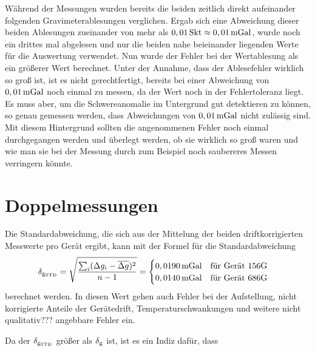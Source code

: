 Während der Messungen wurden bereits die beiden zeitlich direkt aufeinander folgenden Gravimeterablesungen verglichen. Ergab sich eine Abweichung dieser beiden Ablesungen zueinander von mehr als $0,01\,\mathrm{Skt}\approx0,01\,\mathrm{mGal}$, wurde noch ein drittes mal abgelesen und nur die beiden nahe beieinander liegenden Werte für die Auswertung verwendet. Nun wurde der Fehler bei der Wertablesung als ein größerer Wert berechnet. Unter der Annahme, dass der Ablesefehler wirklich so groß ist, ist es nicht gerechtfertigt, bereits bei einer Abweichung von $0,01\,\mathrm{mGal}$ noch einmal zu messen, da der Wert noch in der Fehlertoleranz liegt. Es muss aber, um die Schwereanomalie im Untergrund gut detektieren zu können, so genau gemessen werden, dass Abweichungen von $0,01\,\mathrm{mGal}$ nicht zulässig sind. Mit diesem Hintergrund sollten die angenommenen Fehler noch einmal durchgegangen werden und überlegt werden, ob sie wirklich so groß waren und wie man sie bei der Messung durch zum Beispiel noch saubereres Messen verringern könnte.

\section{Doppelmessungen}
\label{sec:Fehler}

Die Standardabweichung, die sich aus der Mittelung der beiden driftkorrigierten Messwerte pro Gerät ergibt, kann mit der Formel für die Standardabweichung
\begin{equation}
 \delta_{\mathrm{g_{\mathrm{STD}}}}=\sqrt{\frac{\sum_i (\Delta g_i - \overline{\Delta g})^2}{n-1}}
 =\begin{cases}
   0,0190\,\mathrm{mGal} \quad \text{für Gerät 156G}\\
     0,0140\,\mathrm{mGal} \quad \text{für Gerät 686G}
  \end{cases}
  \label{eq:Fehler}
\end{equation}
berechnet werden. In diesen Wert gehen auch Fehler bei der Aufstellung, nicht korrigierte Anteile der Gerätedrift, Temperaturschwankungen und weitere nicht qualitativ??? angebbare Fehler ein.

Da der $\delta_{\mathrm{g_{\mathrm{STD}}}}$ größer als $\delta_{\mathrm{g}}$ ist, ist es ein Indiz dafür, dass 